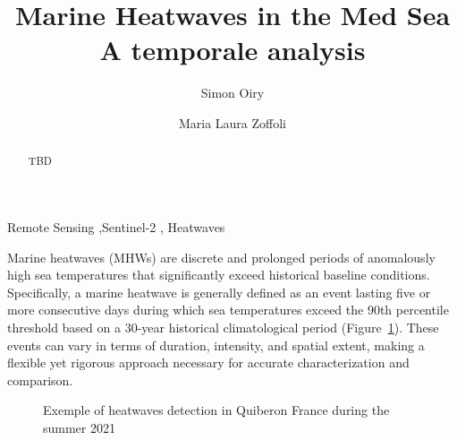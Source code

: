 \documentclass[
  number]{elsarticle}
\begin{document}
\begin{frontmatter}
\title{Marine Heatwaves in the Med Sea \\\large{A temporale analysis} }
\author[1]{Simon Oiry%
%
}
\author[2]{Maria Laura Zoffoli%
%
}





        
\begin{abstract}
TBD
\end{abstract}





\begin{keyword}
    Remote Sensing \sep Sentinel-2 \sep 
    Heatwaves
\end{keyword}
\end{frontmatter}
    

Marine heatwaves (MHWs) are discrete and prolonged periods of
anomalously high sea temperatures that significantly exceed historical
baseline conditions. Specifically, a marine heatwave is generally
defined as an event lasting five or more consecutive days during which
sea temperatures exceed the 90th percentile threshold based on a 30-year
historical climatological period (Figure~\ref{fig-HW_explain}). These
events can vary in terms of duration, intensity, and spatial extent,
making a flexible yet rigorous approach necessary for accurate
characterization and comparison.

\label{cell-fig-HW_explain}
\begin{figure}[H]


\caption{\label{fig-HW_explain}Exemple of heatwaves detection in
Quiberon France during the summer 2021}

\end{figure}%
\end{document}
